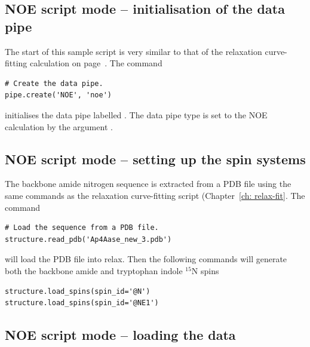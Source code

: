 
\subsection{NOE script mode -- initialisation of the data pipe} \label{NOE initialisation}

The start of this sample script is very similar to that of the relaxation curve-fitting calculation on page~\pageref{Rx initialisation}.  The command

\begin{lstlisting}[firstnumber=3]
# Create the data pipe.
pipe.create('NOE', 'noe')
\end{lstlisting}

initialises the data pipe labelled .  The data pipe type is set to the NOE calculation by the argument .



\subsection{NOE script mode -- setting up the spin systems}

The backbone amide nitrogen sequence is extracted from a PDB file using the same commands as the relaxation curve-fitting script (Chapter~\ref{ch: relax-fit}.  The command

\begin{lstlisting}[firstnumber=6]
# Load the sequence from a PDB file.
structure.read_pdb('Ap4Aase_new_3.pdb')
\end{lstlisting}

will load the PDB file  into relax.  Then the following commands will generate both the backbone amide and tryptophan indole $^{15}$N spins

\begin{lstlisting}[firstnumber=8]
structure.load_spins(spin_id='@N')
structure.load_spins(spin_id='@NE1')
\end{lstlisting}



\subsection{NOE script mode -- loading the data}

